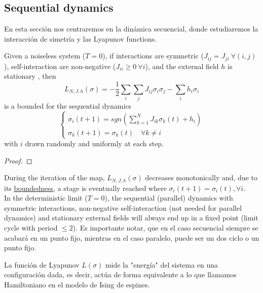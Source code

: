 \subsection{Sequential dynamics}
En esta sección nos centraremos en la dinámica secuencial, donde estudiaremos la interacción de simetría y las Lyapunov functions.

\begin{prop}
    Given a noiseless system ($T=0$), if interactions are symmetric ($J_{ij} = J_{ji} \ \forall (i,j)$), self-interaction are non-negative ($J_{ii} \geq 0 \ \forall i$), and the external field $h$ is stationary , then
    \begin{equation*}
        L_{N,J,h}(\sigma) = -\dfrac{1}{2} \sum_{i} \sum_{j} J_{ij} \sigma_i \sigma_j - \sum_{i} h_i \sigma_i
    \end{equation*}
    is a bounded  for the sequential dynamics
    \begin{equation*}
        \begin{cases}
            \sigma_i (t + 1) = sgn\left(\sum\limits_{k=1}^N J_{ik} \sigma_k (t) + h_i\right) \\
            \sigma_k (t + 1) = \sigma_k (t) \quad \forall k \neq i
        \end{cases}
    \end{equation*}
    with $i$ drawn randomly and uniformly at each step.
    \begin{proof}
    \end{proof}
\end{prop}
\noindent
During the iteration of the map, $L_{N,J,h}(\sigma)$ decreases monotonically and, due to its \underline{boundedness}, a stage is eventually reached where $\sigma_i(t + 1) = \sigma_i(t), \forall i$. \\

\noindent
In the deterministic limit ($T=0$), the sequential (parallel) dynamics with symmetric interactions, non-negative self-interaction (not needed for parallel dynamics) and stationary external fields will always end up in a fixed point (limit cycle with period $\leq 2$). Es importante notar, que en el caso secuencial siempre se acabará en un punto fijo, mientras en el caso paralelo, puede ser un dos ciclo o un punto fijo. \\

\begin{observacion}
    La función de Lyapunov $L(\sigma)$ mide la "energía" del sistema en una configuración dada, es decir, actúa de forma equivalente a lo que llamamos Hamiltoniano en el modelo de Ising de espines.
\end{observacion}

